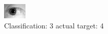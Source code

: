 \begin{figure}[h!]
\begin{center}
\includegraphics[width=0.60\columnwidth]{figures/ID1223_class_3_target_4.png}
\end{center}
\caption{ Classification: 3 actual target: 4}
\label{fig:ID1223_class_3_target_4}
\end{figure}
